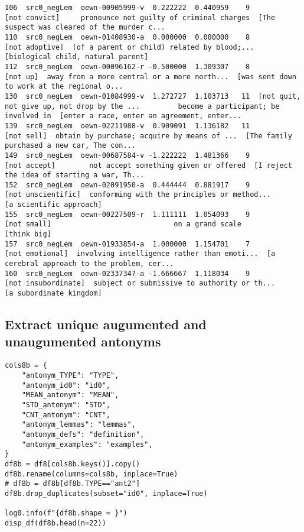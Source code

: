 \documentclass[a4paper,10pt,onecolumn,oneside,openright]{article}
\begin{document}
\begin{verbatim}
106  src0_negLem  oewn-00905999-v  0.222222  0.440959    9                                [not convict]     pronounce not guilty of criminal charges  [The suspect was cleared of the murder c...
110  src0_negLem  oewn-01408930-a  0.000000  0.000000    8                               [not adoptive]  (of a parent or child) related by blood;...           [biological child, natural parent]
112  src0_negLem  oewn-00096162-r -0.500000  1.309307    8                                     [not up]  away from a more central or a more north...  [was sent down to work at the regional o...
130  src0_negLem  oewn-01084999-v  1.272727  1.103713   11  [not quit, not give up, not drop by the ...         become a participant; be involved in  [enter a race, enter an agreement, enter...
139  src0_negLem  oewn-02211988-v  0.909091  1.136182   11                                   [not sell]  obtain by purchase; acquire by means of ...  [The family purchased a new car, The con...
149  src0_negLem  oewn-00687584-v -1.222222  1.481366    9                                 [not accept]        not accept something given or offered  [I reject the idea of starting a war, Th...
152  src0_negLem  oewn-02091950-a  0.444444  0.881917    9                           [not unscientific]  conforming with the principles or method...                      [a scientific approach]
155  src0_negLem  oewn-00227509-r  1.111111  1.054093    9                                  [not small]                             on a grand scale                                  [think big]
157  src0_negLem  oewn-01933854-a  1.000000  1.154701    7                              [not emotional]  involving intelligence rather than emoti...  [a cerebral approach to the problem, cer...
160  src0_negLem  oewn-02337347-a -1.666667  1.118034    9                          [not insubordinate]  subject or submissive to authority or th...                      [a subordinate kingdom]
\end{verbatim}
\subsection{Extract unique augumented and unaugumented antonyms}
\label{sec:org69fa6b1}
\begin{verbatim}
cols8b = {
    "antonym_TYPE": "TYPE",
    "antonym_id0": "id0",
    "MEAN_antonym": "MEAN",
    "STD_antonym": "STD",
    "CNT_antonym": "CNT",
    "antonym_lemmas": "lemmas",
    "antonym_defs": "definition",
    "antonym_examples": "examples",
}
df8b = df8[cols8b.keys()].copy()
df8b.rename(columns=cols8b, inplace=True)
# df8b = df8b[df8b.TYPE=="ant2"]
df8b.drop_duplicates(subset="id0", inplace=True)

log0.info(f"{df8b.shape = }")
disp_df(df8b.head(n=22))
\end{verbatim}
\end{document}
